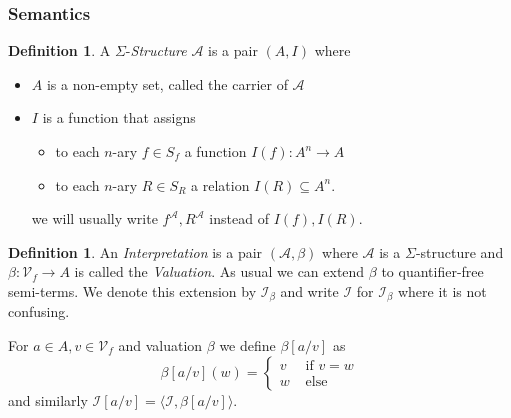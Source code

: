 \documentclass[onehalfspacing]{article}
\theoremstyle{definition}
\theoremstyle{definition}
\theoremstyle{definition}
\theoremstyle{definition}
\theoremstyle{definition}
\newtheorem{definition}[theorem]{Definition}
\theoremstyle{definition}
\newcommand{\I}{\mathcal{I}}
\begin{document}
\subsubsection{Semantics}
\begin{definition}
	A $\Sigma$-\textit{Structure} $\mathcal{A}$ is a pair $(A, I)$ where
	\begin{itemize}
		\item $A$ is a non-empty set, called the carrier of $\mathcal{A}$
		\item $I$ is a function that assigns
		\begin{itemize}
			\item to each $n$-ary $f\in S_f$ a function $I(f): A^n\to A$
			\item to each $n$-ary $R\in S_R$ a relation $I(R)\subseteq A^n$.
		\end{itemize}
		we will usually write $f^\mathcal{A}, R^\mathcal{A}$ instead of $I(f), I(R)$.
	\end{itemize}
\end{definition}


\begin{definition}
	An \textit{Interpretation} is a pair $(\mathcal{A}, \beta)$ where $\mathcal{A}$ is a $\Sigma$-structure and $\beta :\mathcal{V}_f\to A$ is called the \textit{Valuation}. As usual we can extend $\beta$ to quantifier-free semi-terms. We denote this extension by $\I_\beta$ and write $\I$ for $\I_\beta$ where it is not confusing.
	
	For $a\in A, v\in \mathcal{V}_f$ and valuation $\beta$ we define $\beta[a/v]$ as
	$$\beta[a/v](w) = \begin{cases}
		v & \text{ if } v = w\\
		w & \text{ else }
	\end{cases}$$
	and similarly $\I[a/v] = \langle \I, \beta[a/v]\rangle$.
\end{definition}
\end{document}
